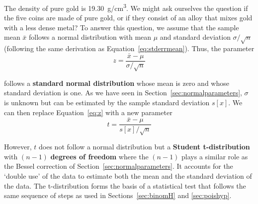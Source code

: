 The density of pure gold is 19.30~g/cm\textsuperscript{3}. We might
ask ourselves the question if the five coins are made of pure gold, or
if they consist of an alloy that mixes gold with a less dense metal?
To answer this question, we assume that the sample mean $\bar{x}$
follows a normal distribution with mean $\mu$ and standard deviation
$\sigma/\sqrt{n}$ (following the same derivation as
Equation~\ref{eq:stderrmean}). Thus, the parameter
\begin{equation}
  z = \frac{\bar{x}-\mu}{\sigma/\sqrt{n}}
  \label{eq:z}
\end{equation}

\noindent follows a \textbf{standard normal distribution} whose mean
is zero and whose standard deviation is one. As we have seen in
Section~\ref{sec:normalparameters}, $\sigma$ is unknown but can be
estimated by the sample standard deviation $s[x]$. We can then
replace Equation~\ref{eq:z} with a new parameter
\begin{equation}
  t = \frac{\bar{x}-\mu}{s[x]/\sqrt{n}}
  \label{eq:t}
\end{equation}

However, $t$ does not follow a normal distribution but a
\textbf{Student t-distribution} with $(n-1)$ \textbf{degrees of
  freedom} where the $(n-1)$ plays a similar role as the Bessel
correction of Section~\ref{sec:normalparameters}. It accounts for the
`double use' of the data to estimate both the mean and the standard
deviation of the data. The t-distribution forms the basis of a
statistical test that follows the same sequence of steps as used in
Sections~\ref{sec:binomH} and \ref{sec:poishyp}.

